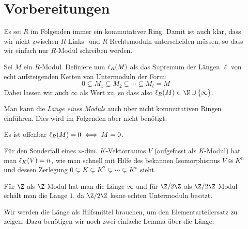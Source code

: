 
\chapter{Vorbereitungen}
Es sei $R$ im Folgenden immer ein kommutativer Ring. Damit ist auch klar, dass
wir nicht zwischen $R$-Links- und $R$-Rechtsmoduln unterscheiden müssen, so dass
wir einfach nur $R$-Modul schreiben werden.

\begin{thDef}
    Sei $M$ ein $R$-Modul. Definiere nun $\len(M)$ als das Supremum der Längen
    $\ell$ von echt aufsteigenden Ketten von Untermoduln der Form:
    \[ 0 \subsetneq M_1 \subsetneq M_2 \subsetneq \cdots \subsetneq M_\ell = M \]
    Dabei lassen wir auch $\infty$ als Wert zu, so dass also $\len(M) \in
    \N\cup\{\infty\}$.
\end{thDef}

\begin{thBemerkung}
    Man kann die \emph{Länge eines Moduls} auch über nicht kommutativen Ringen
    einführen. Dies wird im Folgenden aber nicht benötigt.
\end{thBemerkung}

\begin{BspList}
\item
    Es ist offenbar $\len(M) = 0 \iff M = 0$.
\item
    Für den Sonderfall eines $n$-dim. $K$-Vektorraums $V$ (aufgefasst als
    $K$-Modul) hat man $\len[K](V) = n$, wie man schnell mit Hilfe des bekannen
    Isomorphismus $V \cong K^n$ und dessen Zerlegung $0\subsetneq K \subsetneq
    K^2 \subsetneq \cdots \subsetneq K^n$ sieht.
\item
    Für $\Z$ als $\Z$-Modul hat man die Länge $\infty$ und für $\ZRest2$ als
    $\ZRest2$-Modul erhält man die Länge $1$, da $\ZRest2$ keine echten
    Untermoduln besitzt.
\end{BspList}

Wir werden die Länge als Hilfsmittel brauchen, um den Elementarteilersatz
zu zeigen. Dazu benötigen wir noch zwei einfache Lemma über die Länge:


